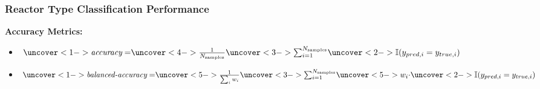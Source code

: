 \begin{frame}
  \frametitle{Reactor Type Classification Performance}
  \textbf{Accuracy Metrics:} \cite{scikit}
  \vspace{2mm}
  \begin{itemize}\addtolength{\itemsep}{0.4\baselineskip}
    \item $\uncover<1->{\textit{accuracy} = }
           \uncover<4->{\frac{1}{N_\text{samples}}}
           \uncover<3->{\sum_{i=1}^{N_\text{samples}}}
           \uncover<2->{\mathbb{I}(y_{pred,i} = y_{true,i})}$
    \item $\uncover<1->{\textit{balanced-accuracy} = }
           \uncover<5->{\frac{1}{\sum_{i}{w_i}}}
           \uncover<3->{\sum_{i=1}^{N_\text{samples}}}
           \uncover<5->{w_i \cdot}
           \uncover<2->{\mathbb{I}(y_{pred, i} = y_{true, i})}$ \\
          \hspace{1.1cm}  
  \end{itemize}
\end{frame}

